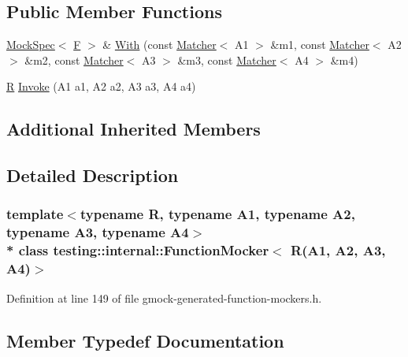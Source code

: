 \subsection*{Public Member Functions}
\begin{DoxyCompactItemize}
\item 
\hyperlink{classtesting_1_1internal_1_1_mock_spec}{Mock\+Spec}$<$ \hyperlink{classtesting_1_1internal_1_1_function_mocker_3_01_r_07_a1_00_01_a2_00_01_a3_00_01_a4_08_4_a9be04bb962edb1458c857ca8e9db9318}{F} $>$ \& \hyperlink{classtesting_1_1internal_1_1_function_mocker_3_01_r_07_a1_00_01_a2_00_01_a3_00_01_a4_08_4_ac29a206739844575e1b92de03be8ad29}{With} (const \hyperlink{classtesting_1_1_matcher}{Matcher}$<$ A1 $>$ \&m1, const \hyperlink{classtesting_1_1_matcher}{Matcher}$<$ A2 $>$ \&m2, const \hyperlink{classtesting_1_1_matcher}{Matcher}$<$ A3 $>$ \&m3, const \hyperlink{classtesting_1_1_matcher}{Matcher}$<$ A4 $>$ \&m4)
\item 
\hyperlink{typedefs__9_8js_afb423b73ee7b6c04d2d54fc06e405404}{R} \hyperlink{classtesting_1_1internal_1_1_function_mocker_3_01_r_07_a1_00_01_a2_00_01_a3_00_01_a4_08_4_ac20228ed7a21f43775a08fb3b1661721}{Invoke} (A1 a1, A2 a2, A3 a3, A4 a4)
\end{DoxyCompactItemize}
\subsection*{Additional Inherited Members}


\subsection{Detailed Description}
\subsubsection*{template$<$typename R, typename A1, typename A2, typename A3, typename A4$>$\\*
class testing\+::internal\+::\+Function\+Mocker$<$ R(\+A1, A2, A3, A4)$>$}



Definition at line 149 of file gmock-\/generated-\/function-\/mockers.\+h.



\subsection{Member Typedef Documentation}
